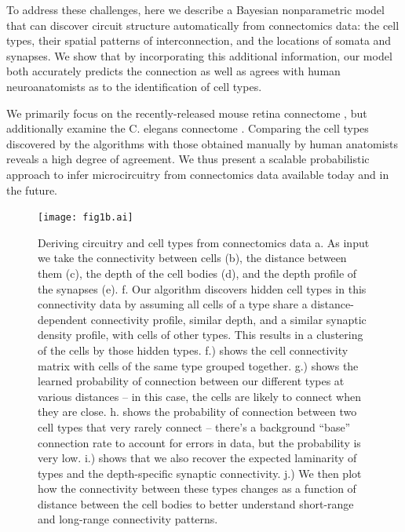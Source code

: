 \documentclass{article}
\begin{document}
To address these challenges, here we describe a Bayesian
nonparametric model that can discover circuit structure automatically
from connectomics data: the cell types, their spatial patterns of
interconnection, and the locations of somata and synapses. We show
that by incorporating this additional information, our model both
accurately predicts the connection as well as agrees
with human neuroanatomists as to the identification of cell types.  

We primarily focus on the recently-released mouse retina connectome
\autocite{Helmstaedter2013}, but additionally examine the C. elegans
connectome \autocite{White1986}. 
Comparing the cell
types discovered by the algorithms with those obtained manually by
human anatomists reveals a high degree of agreement. We thus present a
scalable probabilistic approach to infer microcircuitry from
connectomics data available today and in the future. 

\begin{figure}
  \centering 
  \centerline{\texttt{[image: fig1b.ai]}}
  \caption{Deriving circuitry and cell types from connectomics data
    a. As input we take the connectivity between cells (b), the
    distance between them (c), the depth of the cell bodies (d), and
    the depth profile of the synapses (e). f. Our algorithm discovers
    hidden cell types in this connectivity data by assuming all cells
    of a type share a distance-dependent connectivity profile, similar
    depth, and a similar synaptic density profile, with cells of other
    types.  This results in a clustering of the cells by those hidden
    types. f.) shows the cell connectivity matrix with cells of the
    same type grouped together. g.) shows the learned probability of
    connection between our different types at various distances -- in
    this case, the cells are likely to connect when they are
    close. h. shows the probability of connection between two cell
    types that very rarely connect -- there's a background ``base''
    connection rate to account for errors in data, but the probability
    is very low.  i.) shows that we also recover the expected
    laminarity of types and the depth-specific synaptic
    connectivity. j.) We then plot how the connectivity between these
    types changes as a function of distance between the cell bodies to
    better understand short-range and long-range connectivity
    patterns. }


\label{fig:overview}
\end{figure}
\end{document}
